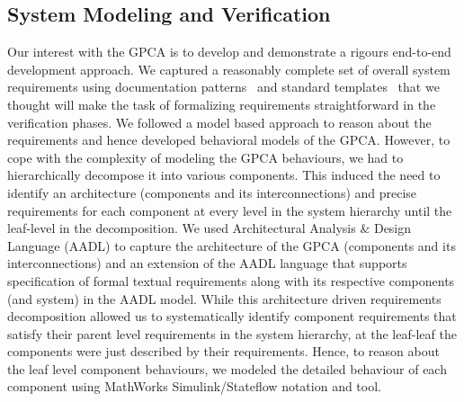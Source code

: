 \subsection {System Modeling and Verification}

Our interest with the GPCA is to develop and demonstrate a rigours end-to-end development approach. We captured a reasonably complete set of overall system requirements using documentation patterns~\cite{mavin2009easy} and standard templates~\cite{IEEEFormats} that we thought will make the task of formalizing requirements straightforward in the verification phases. We followed a model based approach to reason about the requirements and hence developed behavioral models of the GPCA. However, to cope with the complexity of modeling the GPCA behaviours, we had to hierarchically decompose it into various components. This induced the need to identify an architecture (components and its interconnections) and precise requirements for each component at every level in the system hierarchy until the leaf-level in the decomposition. We used Architectural Analysis \& Design Language (AADL) to capture the architecture of the GPCA (components and its interconnections) and an extension of the AADL language that supports specification of formal textual requirements along with its respective components (and system) in the AADL model. While this architecture driven requirements decomposition allowed us to systematically identify component requirements that satisfy their parent level requirements in the system hierarchy, at the leaf-leaf the components were just described by their requirements. Hence, to reason about the leaf level component behaviours, we modeled the detailed behaviour of each component using MathWorks Simulink/Stateflow notation and tool.

